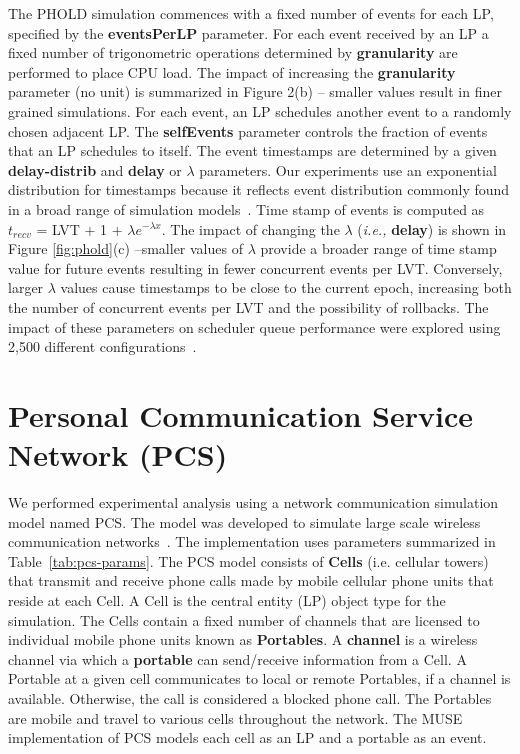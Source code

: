 The PHOLD simulation commences with a fixed number of events for each LP, specified by the \textbf{eventsPerLP} parameter. For each event received by an LP a fixed number of trigonometric operations determined by \textbf{granularity} are performed to place CPU load. The impact of increasing the \textbf{granularity} parameter (no unit) is summarized in Figure 2(b) -- smaller values result in finer grained simulations. For each event, an LP schedules another event to a randomly chosen adjacent LP.  The \textbf{selfEvents} parameter controls the fraction of events that an LP schedules to itself.
The event timestamps are determined by a given \textbf{delay\--distrib} and \textbf{delay} or $\lambda$ parameters. Our experiments use an exponential distribution for timestamps because it reflects event distribution commonly found in a broad range of simulation models~\cite{tang-05}. Time stamp of events is computed as $t_{recv}$ = LVT + 1 + $\lambda e^{-\lambda x}$. The impact of changing the $\lambda$ (\textit{i.e.,} \textbf{delay}) is shown in Figure \ref{fig:phold}(c) --smaller values of $\lambda$ provide a broader range of time stamp value for future events resulting in fewer concurrent events per LVT. Conversely, larger $\lambda$ values cause timestamps to be close to the current epoch, increasing both the number of concurrent events per LVT and the possibility of rollbacks. The impact of these parameters on scheduler queue performance were explored using 2,500 different configurations~\cite{higiro2017multi}.



\section{Personal Communication Service Network (PCS)}\label{sec:pcs}

We performed experimental analysis using a network communication simulation model named PCS. The model was developed to simulate large scale wireless communication networks~\cite{carothers-94}. The implementation uses parameters summarized in Table~\ref{tab:pcs-params}. The PCS model consists of \textbf{Cells} (i.e. cellular towers) that transmit and receive phone calls made by mobile cellular phone units that reside at each Cell. A Cell is the central entity (LP) object type for the simulation. The Cells contain a fixed number of channels that are licensed to individual mobile phone units known as \textbf{Portables}. A \textbf{channel} is a wireless channel via which a \textbf{portable} can send/receive information from a Cell. A Portable at a given cell communicates to local or remote Portables, if a channel is available. Otherwise, the call is considered a blocked phone call. The Portables are mobile and travel to various cells throughout the network. The MUSE implementation of PCS models each cell as an LP and a portable as an event.

